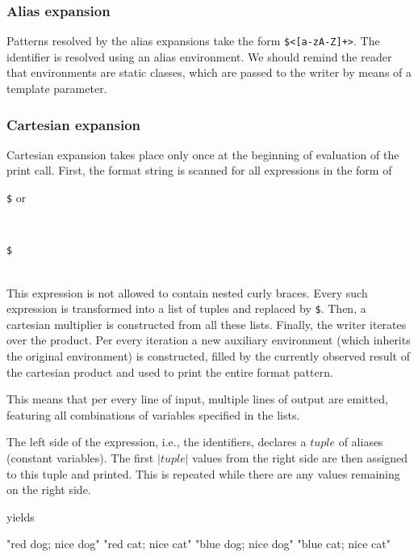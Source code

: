 \subsubsection{Alias expansion}

Patterns resolved by the alias expansions take the form \texttt{\$<[a-zA-Z]+>}. The identifier is resolved using an alias environment. We should remind the reader that environments are static classes, which are passed to the writer by means of a template parameter.


\subsubsection{Cartesian expansion}
Cartesian expansion takes place only once at the beginning of evaluation of the print call. First, the format string is scanned for all expressions in the form of \\ \centerline{\texttt{\$} or} \\ \centerline{\texttt{\$}} \\ This expression is not allowed to contain nested curly braces. Every such expression is transformed into a list of tuples and replaced by \texttt{\$<identifier1>}.  Then, a cartesian multiplier is constructed from all these lists. Finally, the writer iterates over the product. Per every iteration a new auxiliary environment (which inherits the original environment) is constructed, filled by the currently observed result of the cartesian product and used to print the entire format pattern.

This means that per every line of input, multiple lines of output are emitted, featuring all combinations of variables specified in the lists.

The left side of the expression, i.e., the identifiers, declares a $tuple$ of aliases (constant variables). The first $|tuple|$ values from the right side are then assigned to this tuple and printed. This is repeated while there are any values remaining on the right side.

\mybeginfig
{}
yields
\begin{code}
"red dog; nice dog\n"
"red cat; nice cat\n"
"blue dog; nice dog\n"
"blue cat; nice cat\n"
\end{code}

